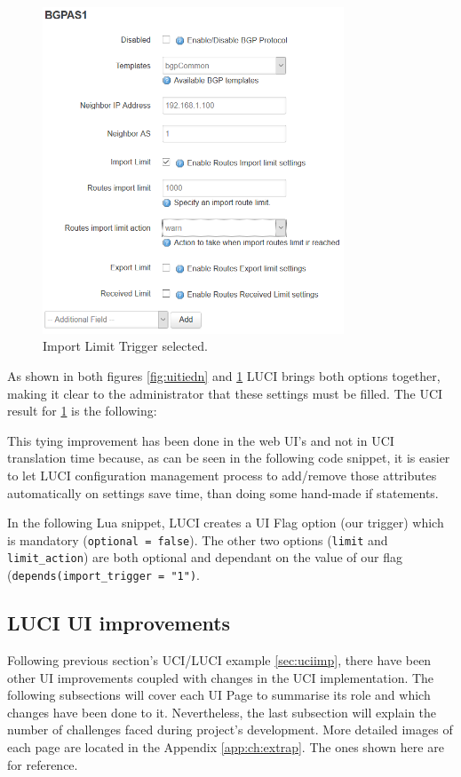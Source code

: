 \begin{itemize}
\begin{figure}[H]
    \centering
    \includegraphics[width=0.8\textwidth]{images/bgp/bgptrigger2}
    \caption{Import Limit Trigger selected.}
    \label{fig:uitiedy}
\end{figure}

As shown in both figures \ref{fig:uitiedn} and \ref{fig:uitiedy} LUCI brings both options together, making it clear to the administrator that these settings must be filled. The UCI result for \ref{fig:uitiedy} is the following:



This tying improvement has been done in the web UI's and not in UCI translation time because, as can be seen in the following code snippet, it is easier to let LUCI configuration management process to add/remove those attributes automatically on settings save time, than doing some hand-made if statements.

In the following Lua snippet, LUCI creates a UI Flag option (our trigger) which is mandatory (\texttt{optional = false}). The other two options (\texttt{limit} and \texttt{limit\_action}) are both optional and dependant on the value of our flag (\texttt{depends({import\_trigger = "1"})}.


\end{itemize}

\newpage

\subsection{LUCI UI improvements}
\label{sec:luciimp}
Following previous section's UCI/LUCI example \ref{sec:uciimp}, there have been other UI improvements coupled with changes in the UCI implementation. The following subsections will cover each UI Page to summarise its role and which changes have been done to it. Nevertheless, the last subsection will explain the number of challenges faced during project's development. More detailed images of each page are located in the Appendix \ref{app:ch:extrap}. The ones shown here are for reference.

